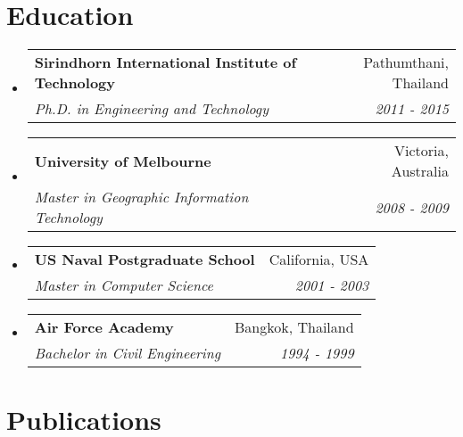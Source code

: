 \documentclass[letterpaper,11pt]{article}
\makeatletter
\newcommand{\resumeItem}[2]{
  \item\small{
    \textbf{#1}{: #2 \vspace{-2pt}}
  }
}
\newcommand{\resumeSubheading}[4]{
  \vspace{-1pt}\item
    \begin{tabular*}{0.97\textwidth}[t]{l@{\extracolsep{\fill}}r}
      \textbf{#1} & #2 \\
      \textit{\small#3} & \textit{\small #4} \\
    \end{tabular*}\vspace{-5pt}
}
\newcommand{\resumeSubItem}[2]{\resumeItem{#1}{#2}\vspace{-4pt}}
\newcommand{\resumeSubHeadingListStart}{\begin{itemize}[leftmargin=*]}
\newcommand{\resumeSubHeadingListEnd}{\end{itemize}}
\makeatother
\begin{document}
\section{Education}
\resumeSubHeadingListStart
  \resumeSubheading
    {Sirindhorn International Institute of Technology}{Pathumthani, Thailand}
    {Ph.D. in Engineering and Technology}{2011 - 2015}
  \resumeSubheading
    {University of Melbourne}{Victoria, Australia}
    {Master in Geographic Information Technology}{2008 - 2009}
  \resumeSubheading
    {US Naval Postgraduate School}{California, USA}
    {Master in Computer Science}{2001 - 2003}
  \resumeSubheading
    {Air Force Academy}{Bangkok, Thailand}
    {Bachelor in Civil Engineering}{1994 - 1999}
\resumeSubHeadingListEnd


%


\section{Publications}
\begin{refsection}
  \nocite{Kerdsri2017}
  \nocite{doi:10.1155/2015/819178}
  \nocite{Kerdsri2013}
  \nocite{journal2013}
  \nocite{waset2011}
  \AtNextBibliography{\small}
	\printbibliography[title={Journals}]
\end{refsection}
\end{document}
